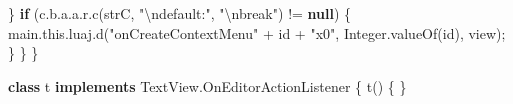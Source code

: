 \documentclass[
]{article}
\newenvironment{Shaded}{}{}
\newcommand{\BuiltInTok}[1]{\textcolor[rgb]{0.00,0.50,0.00}{#1}}
\newcommand{\ControlFlowTok}[1]{\textcolor[rgb]{0.00,0.44,0.13}{\textbf{#1}}}
\newcommand{\FunctionTok}[1]{\textcolor[rgb]{0.02,0.16,0.49}{#1}}
\newcommand{\KeywordTok}[1]{\textcolor[rgb]{0.00,0.44,0.13}{\textbf{#1}}}
\newcommand{\NormalTok}[1]{#1}
\newcommand{\OperatorTok}[1]{\textcolor[rgb]{0.40,0.40,0.40}{#1}}
\newcommand{\SpecialCharTok}[1]{\textcolor[rgb]{0.25,0.44,0.63}{#1}}
\newcommand{\StringTok}[1]{\textcolor[rgb]{0.25,0.44,0.63}{#1}}
\begin{document}
\begin{Shaded}
\begin{Highlighting}[]
            \OperatorTok{\}}
            \ControlFlowTok{if} \OperatorTok{(}\NormalTok{c}\OperatorTok{.}\FunctionTok{b}\OperatorTok{.}\FunctionTok{a}\OperatorTok{.}\FunctionTok{a}\OperatorTok{.}\FunctionTok{r}\OperatorTok{.}\FunctionTok{c}\OperatorTok{(}\NormalTok{strC}\OperatorTok{,} \StringTok{"}\SpecialCharTok{\textbackslash{}n}\StringTok{default:"}\OperatorTok{,} \StringTok{"}\SpecialCharTok{\textbackslash{}n}\StringTok{break"}\OperatorTok{)} \OperatorTok{!=} \KeywordTok{null}\OperatorTok{)} \OperatorTok{\{}
\NormalTok{                main}\OperatorTok{.}\FunctionTok{this}\OperatorTok{.}\FunctionTok{luaj}\OperatorTok{.}\FunctionTok{d}\OperatorTok{(}\StringTok{"onCreateContextMenu"} \OperatorTok{+}\NormalTok{ id }\OperatorTok{+} \StringTok{"x0"}\OperatorTok{,} \BuiltInTok{Integer}\OperatorTok{.}\FunctionTok{valueOf}\OperatorTok{(}\NormalTok{id}\OperatorTok{),}\NormalTok{ view}\OperatorTok{);}
            \OperatorTok{\}}
        \OperatorTok{\}}
    \OperatorTok{\}}

    \KeywordTok{class}\NormalTok{ t }\KeywordTok{implements}\NormalTok{ TextView}\OperatorTok{.}\FunctionTok{OnEditorActionListener} \OperatorTok{\{}
        \FunctionTok{t}\OperatorTok{()} \OperatorTok{\{}
        \OperatorTok{\}}


\end{Highlighting}
\end{Shaded}
\end{document}
